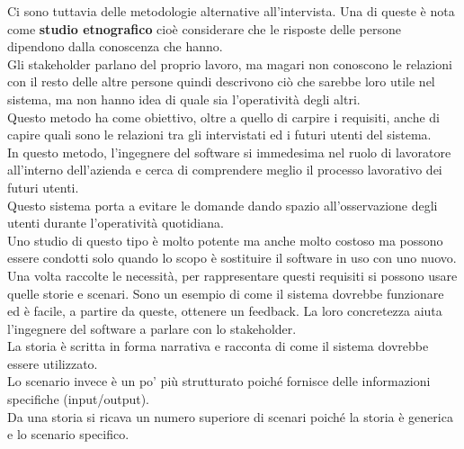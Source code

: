 Ci sono tuttavia delle metodologie alternative all'intervista.
Una di queste è nota come \textbf{studio etnografico} cioè considerare che le risposte delle persone dipendono dalla conoscenza che hanno.\\
Gli stakeholder parlano del proprio lavoro, ma magari non conoscono le relazioni con il resto delle altre persone quindi descrivono ciò che sarebbe loro utile nel sistema, ma non hanno idea di quale sia l'operatività degli altri.\\
Questo metodo ha come obiettivo, oltre a quello di carpire i requisiti, anche di capire quali sono le relazioni tra gli intervistati ed i futuri utenti del sistema.\\
In questo metodo, l'ingegnere del software si immedesima nel ruolo di lavoratore all'interno dell'azienda e cerca di comprendere meglio il processo lavorativo dei futuri utenti.\\
Questo sistema porta a evitare le domande dando spazio all'osservazione degli utenti durante l'operatività quotidiana.\\
Uno studio di questo tipo è molto potente ma anche molto costoso ma possono essere condotti solo quando lo scopo è sostituire il software in uso con uno nuovo.\\
Una volta raccolte le necessità, per rappresentare questi requisiti si possono usare quelle storie e scenari.
Sono un esempio di come il sistema dovrebbe funzionare ed è facile, a partire da queste, ottenere un feedback.
La loro concretezza aiuta l'ingegnere del software a parlare con lo stakeholder.\\
La storia è scritta in forma narrativa e racconta di come il sistema dovrebbe essere utilizzato.\\
Lo scenario invece è un po' più strutturato poiché fornisce delle informazioni specifiche (input/output).\\
Da una storia si ricava un numero superiore di scenari poiché la storia è generica e lo scenario specifico.

